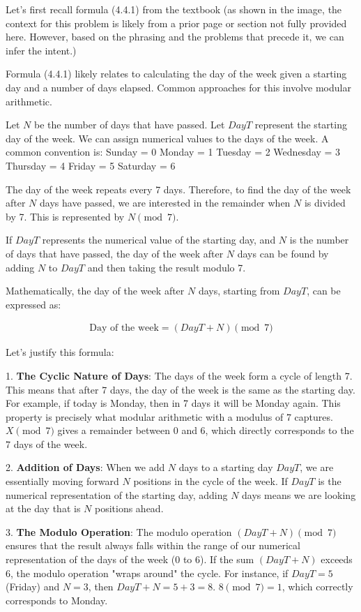 \documentclass{article}
\begin{document}
Let's first recall formula (4.4.1) from the textbook (as shown in the image, the context for this problem is likely from a prior page or section not fully provided here. However, based on the phrasing and the problems that precede it, we can infer the intent.)

Formula (4.4.1) likely relates to calculating the day of the week given a starting day and a number of days elapsed. Common approaches for this involve modular arithmetic.

Let $N$ be the number of days that have passed.
Let $DayT$ represent the starting day of the week. We can assign numerical values to the days of the week. A common convention is:
Sunday = 0
Monday = 1
Tuesday = 2
Wednesday = 3
Thursday = 4
Friday = 5
Saturday = 6

The day of the week repeats every 7 days. Therefore, to find the day of the week after $N$ days have passed, we are interested in the remainder when $N$ is divided by 7. This is represented by $N \pmod{7}$.

If $DayT$ represents the numerical value of the starting day, and $N$ is the number of days that have passed, the day of the week after $N$ days can be found by adding $N$ to $DayT$ and then taking the result modulo 7.

Mathematically, the day of the week after $N$ days, starting from $DayT$, can be expressed as:

\begin{align} \label{eq:1} \text{Day of the week} = (DayT + N) \pmod{7}\end{align}

Let's justify this formula:

1.  \textbf{The Cyclic Nature of Days}: The days of the week form a cycle of length 7. This means that after 7 days, the day of the week is the same as the starting day. For example, if today is Monday, then in 7 days it will be Monday again. This property is precisely what modular arithmetic with a modulus of 7 captures. $X \pmod{7}$ gives a remainder between 0 and 6, which directly corresponds to the 7 days of the week.

2.  \textbf{Addition of Days}: When we add $N$ days to a starting day $DayT$, we are essentially moving forward $N$ positions in the cycle of the week. If $DayT$ is the numerical representation of the starting day, adding $N$ days means we are looking at the day that is $N$ positions ahead.

3.  \textbf{The Modulo Operation}: The modulo operation $(DayT + N) \pmod{7}$ ensures that the result always falls within the range of our numerical representation of the days of the week (0 to 6). If the sum $(DayT + N)$ exceeds 6, the modulo operation "wraps around" the cycle. For instance, if $DayT = 5$ (Friday) and $N = 3$, then $DayT + N = 5 + 3 = 8$. $8 \pmod{7} = 1$, which correctly corresponds to Monday.
\end{document}
